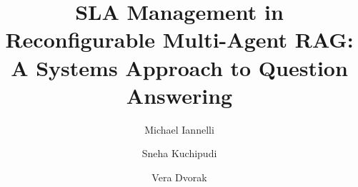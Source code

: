 \documentclass[sigconf,nonacm]{acmart}
\begin{document}
\title[SLA Management in Reconfigurable Multi-Agent RAG]{SLA Management in Reconfigurable Multi-Agent RAG: A Systems Approach to Question Answering}



\author{Michael Iannelli}

\author{Sneha Kuchipudi}

\author{Vera Dvorak}

\renewcommand{\shortauthors}{Iannelli et al.}
\end{document}
